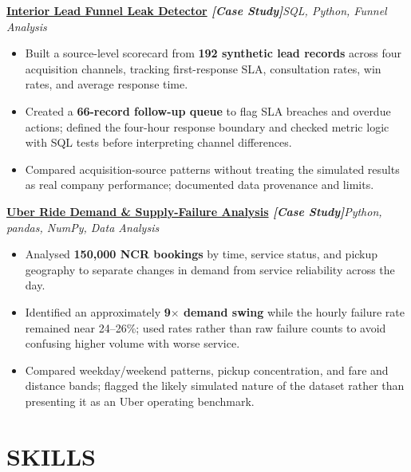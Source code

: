 \documentclass[10pt,a4paper]{article}
\newcommand{\resumeProject}[2]{%
  \textbf{#1}\hfill{\small\textit{#2}}\vspace{-3pt}
}
\begin{document}
\resumeProject
  {\href{https://nothing0g.github.io/analyst/projects/interior-lead-funnel/}
  {Interior Lead Funnel Leak Detector}
  \hspace{3pt}\textnormal{{\color{githubblue}\textit{[Case Study]}}}}
  {SQL, Python, Funnel Analysis}

\begin{itemize}
  \item Built a source-level scorecard from \textbf{192 synthetic lead
  records} across four acquisition channels, tracking first-response SLA,
  consultation rates, win rates, and average response time.

  \item Created a \textbf{66-record follow-up queue} to flag SLA breaches
  and overdue actions; defined the four-hour response boundary and checked
  metric logic with SQL tests before interpreting channel differences.

  \item Compared acquisition-source patterns without treating the simulated
  results as real company performance; documented data provenance and limits.
\end{itemize}

\resumeProject
  {\href{https://nothing0g.github.io/analyst/projects/uber-ride-demand/}
  {Uber Ride Demand \& Supply-Failure Analysis}
  \hspace{3pt}\textnormal{{\color{githubblue}\textit{[Case Study]}}}}
  {Python, pandas, NumPy, Data Analysis}

\begin{itemize}
  \item Analysed \textbf{150,000 NCR bookings} by time, service status,
  and pickup geography to separate changes in demand from service
  reliability across the day.

  \item Identified an approximately \textbf{9$\times$ demand swing} while
  the hourly failure rate remained near 24--26\%; used rates rather than
  raw failure counts to avoid confusing higher volume with worse service.

  \item Compared weekday/weekend patterns, pickup concentration, and fare
  and distance bands; flagged the likely simulated nature of the dataset
  rather than presenting it as an Uber operating benchmark.
\end{itemize}


\section*{SKILLS}
\end{document}
